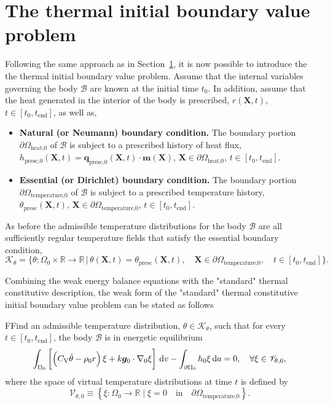 \section{The thermal initial boundary value problem}

Following the same approach as in Section~\ref{}, it is now possible to introduce the the thermal initial boundary value problem.
Assume that the internal variables governing the body \(\mathcal B\) are known at the initial time \(t_0\).
In addition, assume that the heat generated in the interior of the body is prescribed, \(r(\bm X, t)\), \(t\in[t_0, t_\text{end}]\), as well as,
\begin{itemize}
  \item \textbf{Natural (or Neumann) boundary condition.} The boundary portion \(\partial \Omega_\text{heat,0}\) of \(\mathcal B\) is subject to a prescribed history of heat flux, \(h_\text{presc,0}(\bm X, t) = \bm q_\text{presc,0}(\bm X, t)\cdot \bm m(\bm X)\), \(\bm X \in \partial \Omega_\text{heat,0}\), \(t\in [t_0,t_\text{end}]\).
  \item \textbf{Essential (or Dirichlet) boundary condition.} The boundary portion \(\partial \Omega_\text{temperature,0}\) of \(\mathcal B\) is subject to a prescribed temperature history, \(\theta_\text{presc}(\bm X, t)\), \(\bm X \in \partial \Omega_\text{temperature,0}\), \(t\in [t_0,t_\text{end}]\).
\end{itemize}

As before the admissible temperature distributions for the body \(\mathcal B\) are all sufficiently regular temperature fields that satisfy the essential boundary condition,
\begin{equation}
  \mathscr K_\theta = \{\theta:\Omega_0 \times \mathbb R \to \mathbb R\,|\,\theta(\bm X, t) = \theta_\text{presc}(\bm X, t),\quad \bm X\in \partial \Omega_\text{temperature,0},\quad t\in[t_0, t_\text{end}]\}.
\end{equation}

Combining the weak energy balance equations with the "standard" thermal constitutive description, the weak form of the "standard" thermal constitutive initial boundary value problem can be stated as follows
 \begin{problem}
     FFind an admissible temperature distribution, $\theta \in \mathscr{K}_\theta$, such that for every $t\in [t_0,t_\text{end}]$, the body $\mathscr{B}$ is in energetic equilibrium
         \begin{equation}
         \int_{\Omega_0}   \left[\left(C_\mathrm{V} \dot \theta - \rho_0 r\right) \xi +k\bm g_0\cdot \nabla_0 \xi\right]\,\mathrm{d} v - \int_{\partial\Omega_0} h_0 \xi\,\mathrm{d} a = 0,\quad \forall \xi \in \mathscr{V}_{\theta,0},
     \end{equation}
     where the space of virtual temperature distributions at time $t$ is defined by
     \begin{equation}
         \mathscr{V}_{\theta,0} \equiv \left\{\xi:\Omega_0\to \mathbb R\;|\;\xi = 0\quad \text{in}\quad \partial\Omega_\text{temperature,0}\right\}.
     \end{equation}
 \end{problem}

